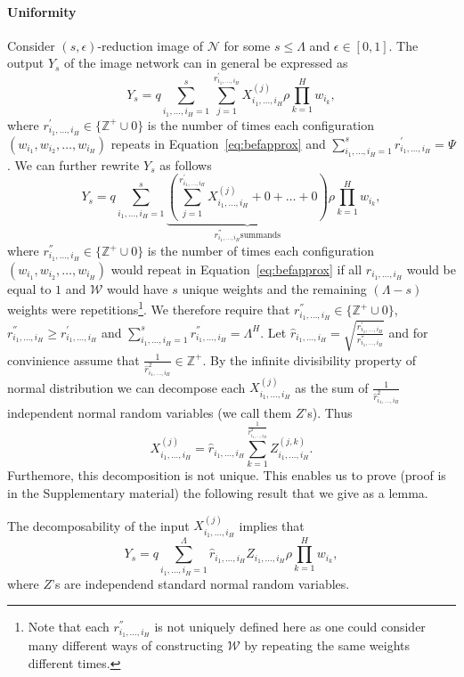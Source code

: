 \documentclass[twoside]{article}
\begin{document}
\paragraph{Uniformity}
Consider $(s,\epsilon)$-reduction image of $\mathcal{N}$ for some $s \leq \Lambda$ and $\epsilon \in [0,1]$. The output $Y_s$ of the image network can in general be expressed as
\[Y_s = q\!\!\!\sum_{i_1,\dots,i_H=1}^{s}\!\!\!\sum_{j=1}^{r_{i_1,\dots,i_H}^{'}}X_{i_1,\dots,i_H}^{(j)}\rho\prod_{k = 1}^{H}\!\!w_{i_k},
\]
where $r_{i_1,\dots,i_H}^{'} \in \{\mathbb{Z}^{+}\cup{0}\}$ is the number of times each configuration $(w_{i_1},w_{i_2},\dots,w_{i_H})$ repeats in Equation~\ref{eq:befapprox} and $\sum_{i_1,\dots,i_H=1}^{s}r_{i_1,\dots,i_H}^{'} = \Psi$. We can further rewrite $Y_s$ as follows
\[Y_s = q\!\!\!\sum_{i_1,\dots,i_H=1}^{s}\!\!\underbrace{\left(\!\sum_{j=1}^{r_{i_1,\dots,i_H}^{'}}\!\!\!X_{i_1,\dots,i_H}^{(j)} + 0 + \dots + 0\right)}_{r_{i_1,\dots,i_H}^{''} \text{summands}}\!\!\rho\prod_{k = 1}^{H}\!\!w_{i_k},
\]
where $r_{i_1,\dots,i_H}^{''} \in \{\mathbb{Z}^{+}\cup{0}\}$ is the number of times each configuration $(w_{i_1},w_{i_2},\dots,w_{i_H})$ would repeat in Equation~\ref{eq:befapprox} if all $r_{i_1,\dots,i_H}$ would be equal to $1$ and $\mathcal{W}$ would have $s$ unique weights and the remaining $(\Lambda - s)$ weights were repetitions\footnote{Note that each $r_{i_1,\dots,i_H}^{''}$ is not uniquely defined here as one could consider many different ways of constructing $\mathcal{W}$ by repeating the same weights different times.}. We therefore require that $r_{i_1,\dots,i_H}^{''} \in \{\mathbb{Z}^{+}\cup{0}\}$, $r_{i_1,\dots,i_H}^{''} \geq r_{i_1,\dots,i_H}^{'}$ and $\sum_{i_1,\dots,i_H=1}^{s}r_{i_1,\dots,i_H}^{''} = \Lambda^H$. Let $\hat{r}_{i_1,\dots,i_H} = \sqrt{\frac{r_{i_1,\dots,i_H}^{'}}{r_{i_1,\dots,i_H}^{''}}}$ and for convinience assume that $\frac{1}{\hat{r}_{i_1,\dots,i_H}^2} \in \mathbb{Z}^{+}$. By the infinite divisibility property of normal distribution we can decompose each $X_{i_1,\dots,i_H}^{(j)}$ as the sum of $\frac{1}{\hat{r}_{i_1,\dots,i_H}^2}$ independent normal random variables (we call them $Z$'s). Thus
\[X_{i_1,\dots,i_H}^{(j)} = \hat{r}_{i_1,\dots,i_H}\sum_{k=1}^{\frac{1}{\hat{r}_{i_1,\dots,i_H}^2}}Z_{i_1,\dots,i_H}^{(j,k)}.
\]
Furthemore, this decomposition is not unique. This enables us to prove (proof is in the Supplementary material) the following result that we give as a lemma.
\begin{lemma}
The decomposability of the input $X_{i_1,\dots,i_H}^{(j)}$ implies that
\[Y_s = q\sum_{i_1,\dots,i_H=1}^{\Lambda}\hat{r}_{i_1,\dots,i_H}Z_{i_1,\dots,i_H}\rho\prod_{k = 1}^{H}w_{i_k},
\]
where $Z$'s are independend standard normal random variables.
\label{lem:tmp2}
\end{lemma}
\end{document}
